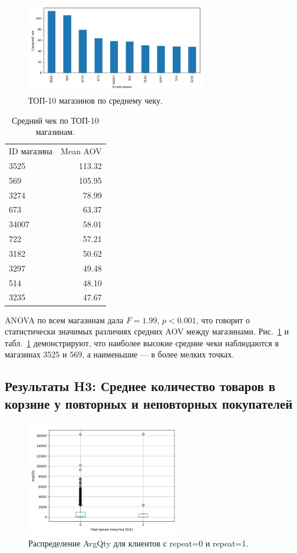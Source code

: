\documentclass[a4paper]{article}
\begin{document}
\begin{figure}[H]
  \centering
  \includegraphics[width=0.7\textwidth]{img/top_stores_mean_aov.png}
  \caption{ТОП-10 магазинов по среднему чеку.}
  \label{fig:top10_stores}
\end{figure}

\begin{table}[H]
  \centering
  \begin{tabular}{lr}
    ID магазина & {Mean AOV} \\
    3525 & 113.32 \\
    569  & 105.95 \\
    3274 &  78.99 \\
    673  &  63.37 \\
    34007&  58.01 \\
    722  &  57.21 \\
    3182 &  50.62 \\
    3297 &  49.48 \\
    514  &  48.10 \\
    3235 &  47.67 \\
  \end{tabular}
  \caption{Средний чек по ТОП-10 магазинам.}
  \label{tab:top10}
\end{table}

\noindent
ANOVA по всем магазинам дала \(F=1.99\), \(p<0.001\), что говорит о статистически значимых различиях средних AOV между магазинами. Рис.~\ref{fig:top10_stores} и табл.~\ref{tab:top10} демонстрируют, что наиболее высокие средние чеки наблюдаются в магазинах 3525 и 569, а наименьшие — в более мелких точках.

\subsection{Результаты H3: Среднее количество товаров в корзине у повторных и неповторных покупателей}

\begin{figure}[H]
  \centering
  \includegraphics[width=0.6\textwidth]{img/boxplot_avgqty_repeat.png}
  \caption{Распределение AvgQty для клиентов с repeat=0 и repeat=1.}
  \label{fig:h3_box}
\end{figure}
\end{document}
